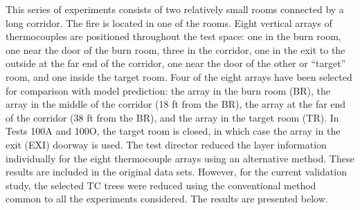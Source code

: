 This series of experiments consists of two relatively small rooms connected by a long corridor. The fire is located in one of the rooms.  Eight
vertical arrays of thermocouples are positioned throughout the test space: one in the burn room, one near the door of the burn room, three in the
corridor, one in the exit to the outside at the far end of the corridor, one near the door of the other or ``target'' room, and one inside the target
room.  Four of the eight arrays have been selected for comparison with model prediction: the array in the burn room (BR), the array in the middle of
the corridor (18 ft from the BR), the array at the far end of the corridor (38 ft from the BR), and the array in the target room (TR).  In Tests 100A
and 100O, the target room is closed, in which case the array in the exit (EXI) doorway is used. The test director reduced the layer information
individually for the eight thermocouple arrays using an alternative method. These results are included in the original data sets. However, for the
current validation study, the selected TC trees were reduced using the conventional method common to all the experiments considered.  The results are
presented below.

\newpage


